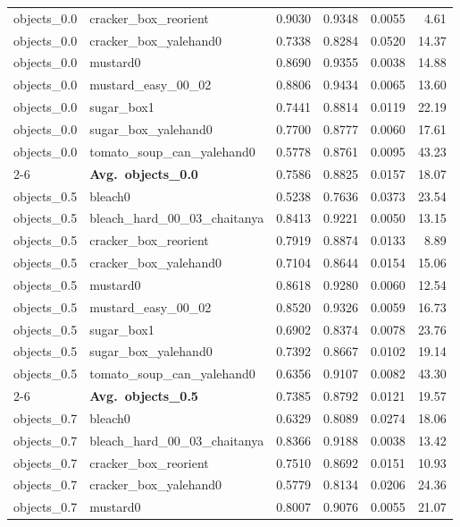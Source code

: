 \begin{longtable}{llrrrr}
  objects_0.0 & cracker\_box\_reorient & 0.9030 & 0.9348 & 0.0055 & 4.61 \\
  objects_0.0 & cracker\_box\_yalehand0 & 0.7338 & 0.8284 & 0.0520 & 14.37 \\
  objects_0.0 & mustard0 & 0.8690 & 0.9355 & 0.0038 & 14.88 \\
  objects_0.0 & mustard\_easy\_00\_02 & 0.8806 & 0.9434 & 0.0065 & 13.60 \\
  objects_0.0 & sugar\_box1 & 0.7441 & 0.8814 & 0.0119 & 22.19 \\
  objects_0.0 & sugar\_box\_yalehand0 & 0.7700 & 0.8777 & 0.0060 & 17.61 \\
  objects_0.0 & tomato\_soup\_can\_yalehand0 & 0.5778 & 0.8761 & 0.0095 & 43.23 \\
  \cmidrule{2-6}
  & \textbf{Avg.~objects_0.0} & 0.7586 & 0.8825 & 0.0157 & 18.07 \\
  \midrule
  objects_0.5 & bleach0 & 0.5238 & 0.7636 & 0.0373 & 23.54 \\
  objects_0.5 & bleach\_hard\_00\_03\_chaitanya & 0.8413 & 0.9221 & 0.0050 & 13.15 \\
  objects_0.5 & cracker\_box\_reorient & 0.7919 & 0.8874 & 0.0133 & 8.89 \\
  objects_0.5 & cracker\_box\_yalehand0 & 0.7104 & 0.8644 & 0.0154 & 15.06 \\
  objects_0.5 & mustard0 & 0.8618 & 0.9280 & 0.0060 & 12.54 \\
  objects_0.5 & mustard\_easy\_00\_02 & 0.8520 & 0.9326 & 0.0059 & 16.73 \\
  objects_0.5 & sugar\_box1 & 0.6902 & 0.8374 & 0.0078 & 23.76 \\
  objects_0.5 & sugar\_box\_yalehand0 & 0.7392 & 0.8667 & 0.0102 & 19.14 \\
  objects_0.5 & tomato\_soup\_can\_yalehand0 & 0.6356 & 0.9107 & 0.0082 & 43.30 \\
  \cmidrule{2-6}
  & \textbf{Avg.~objects_0.5} & 0.7385 & 0.8792 & 0.0121 & 19.57 \\
  \midrule
  objects_0.7 & bleach0 & 0.6329 & 0.8089 & 0.0274 & 18.06 \\
  objects_0.7 & bleach\_hard\_00\_03\_chaitanya & 0.8366 & 0.9188 & 0.0038 & 13.42 \\
  objects_0.7 & cracker\_box\_reorient & 0.7510 & 0.8692 & 0.0151 & 10.93 \\
  objects_0.7 & cracker\_box\_yalehand0 & 0.5779 & 0.8134 & 0.0206 & 24.36 \\
  objects_0.7 & mustard0 & 0.8007 & 0.9076 & 0.0055 & 21.07 \\

\end{longtable}

